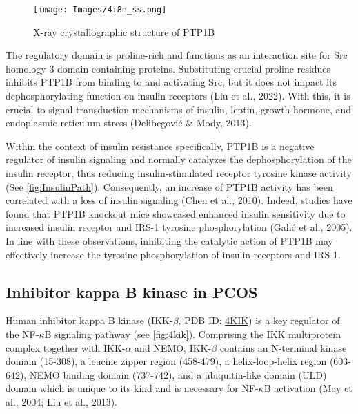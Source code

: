     \begin{figure} 
        \centering
        \texttt{[image: Images/4i8n\_ss.png]}
        \caption{X-ray crystallographic structure of PTP1B}
        \label{fig:4i8n}
    \end{figure}

The regulatory domain is proline-rich and functions as an interaction site for Src homology 3 domain-containing proteins. Substituting crucial proline residues inhibits PTP1B from binding to and activating Src, but it does not impact its dephosphorylating function on insulin receptors (Liu et al., 2022). With this, it is crucial to signal transduction mechanisms of insulin, leptin, growth hormone, and endoplasmic reticulum stress (Delibegović \& Mody, 2013). 

Within the context of insulin resistance specifically, PTP1B is a negative regulator of insulin signaling and normally catalyzes the dephosphorylation of the insulin receptor, thus reducing insulin-stimulated receptor tyrosine kinase activity (See \ref{fig:InsulinPath}). Consequently, an increase of PTP1B activity has been correlated with a loss of insulin signaling (Chen et al., 2010). Indeed, studies have found that PTP1B knockout mice showcased enhanced insulin sensitivity due to increased insulin receptor and IRS-1 tyrosine phosphorylation (Galić et al., 2005). In line with these observations, inhibiting the catalytic action of PTP1B may effectively increase the tyrosine phosphorylation of insulin receptors and IRS-1.  

\subsection{Inhibitor kappa B kinase in PCOS}
Human inhibitor kappa B kinase (IKK-$\beta$, PDB ID: \href{https://www.rcsb.org/structure/4KIK}{4KIK}) is a key regulator of the NF-$\kappa$B signaling pathway (see \ref{fig:4kik}). Comprising the IKK multiprotein complex together with IKK-$\alpha$ and NEMO, IKK-$\beta$ contains an N-terminal kinase domain (15-308), a leucine zipper region (458-479), a helix-loop-helix region (603-642), NEMO binding domain (737-742), and a ubiquitin-like domain (ULD) domain which is unique to its kind and is necessary for NF-$\kappa$B activation (May et al., 2004; Liu et al., 2013). 

